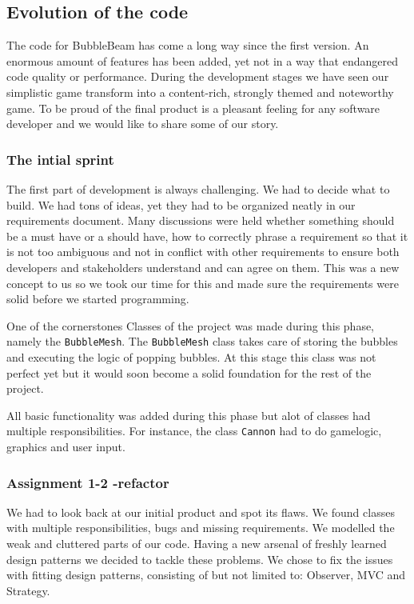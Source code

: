 \documentclass[a4paper]{article}
\begin{document}
\subsection {Evolution of the code}
The code for BubbleBeam has come a long way since the first version. An enormous amount of features has been added, yet not in a way that endangered code quality or performance. During the development stages we have seen our simplistic game transform into a content-rich, strongly themed and noteworthy game. To be proud of the final product is a pleasant feeling for any software developer and we would like to share some of our story.

\subsubsection{The intial sprint}
The first part of development is always challenging. We had to decide what to build. We had tons of ideas, yet they had to be organized neatly in our requirements document. Many discussions were held whether something should be a must have or a should have, how to correctly phrase a requirement so that it is not too ambiguous and not in conflict with other requirements to ensure both developers and stakeholders understand and can agree on them. This was a new concept to us so we took our time for this and made sure the requirements were solid before we started programming. 

One of the cornerstones Classes of the project was made during this phase, namely the \texttt{BubbleMesh}. The \texttt{BubbleMesh} class takes care of storing the bubbles and executing the logic of popping bubbles. At this stage this class was not perfect yet but it would soon become a solid foundation for the rest of the project.

All basic functionality was added during this phase but alot of classes had multiple responsibilities. For instance, the class \texttt{Cannon} had to do gamelogic, graphics and user input.

\subsubsection{Assignment 1-2 -refactor}
We had to look back at our initial product and spot its flaws. We found classes with multiple responsibilities, bugs and missing requirements. We modelled the weak and cluttered parts of our code. Having a new arsenal of freshly learned design patterns we decided to tackle these problems. We chose to fix the issues with fitting design patterns, consisting of but not limited to: Observer, MVC and Strategy.
\end{document}
